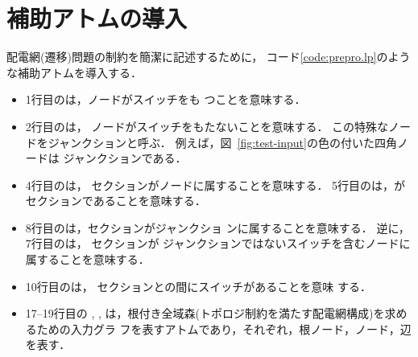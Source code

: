 \section{補助アトムの導入}\label{chap:prepro}



配電網(遷移)問題の制約を簡潔に記述するために，
コード\ref{code:prepro.lp}のような補助アトムを導入する．
\begin{itemize}
\item 1行目のは，ノードがスイッチをも
  つことを意味する．
\item 2行目のは，
  ノードがスイッチをもたないことを意味する．
  この特殊なノードをジャンクションと呼ぶ．
  例えば，図~\ref{fig:test-input}の色の付いた四角ノードは
  ジャンクションである．
\item 4行目のは，
  セクションがノードに属することを意味する．
  5行目のは，がセクションであることを意味する．
\item 8行目のは，セクションがジャンクショ
  ンに属することを意味する．
  逆に，7行目のは，
  セクションが
  ジャンクションではないスイッチを含むノードに属することを意味する．
\item 10行目のは，
  セクションとの間にスイッチがあることを意味
  する．
\item 17--19行目の
,
,
は，根付き全域森(トポロジ制約を満たす配電網構成)を求めるための入力グラ
フを表すアトムであり，それぞれ，根ノード，ノード，辺を表す．


\end{itemize}
